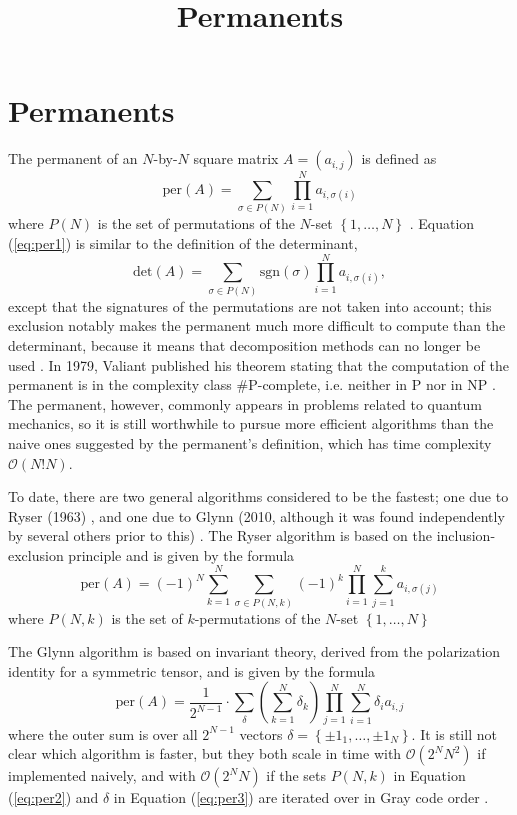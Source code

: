 \documentclass{article}
\title{Permanents}
\begin{document}
\section*{Permanents}

The permanent of an $N$-by-$N$ square matrix $A = \left(a_{i,j}\right)$ is defined as
\begin{equation} \label{eq:per1}
    \text{per}(A) = \sum_{\sigma \in P(N)}{\prod_{i=1}^N{a_{i,{\sigma(i)}}}}
\end{equation}
where $P(N)$ is the set of permutations of the $N$-set $\left\{1,\dots,N\right\}$
\cite{wiki:permanent}. Equation (\ref{eq:per1}) is similar to the definition of the determinant,
\begin{equation} \label{eq:det1}
    \text{det}(A) = \sum_{\sigma \in P(N)}{\text{sgn}(\sigma) \prod_{i=1}^N{a_{i,{\sigma(i)}}}},
\end{equation}
except that the signatures of the permutations are not taken into account; this exclusion notably
makes the permanent much more difficult to compute than the determinant, because it means that
decomposition methods can no longer be used \cite{wiki:computing}. In 1979, Valiant published his
theorem stating that the computation of the permanent is in the complexity class \#P-complete, i.e.
neither in P nor in NP \cite{valiant1979}. The permanent, however, commonly appears in problems
related to quantum mechanics, so it is still worthwhile to pursue more efficient algorithms than the
naive ones suggested by the permanent's definition, which has time complexity $\mathcal{O}(N!N)$.

To date, there are two general algorithms considered to be the fastest; one due to Ryser (1963)
\cite{ryser1963}, and one due to Glynn (2010, although it was found independently by several others
prior to this) \cite{wiki:computing,glynn2010}. The Ryser algorithm is based on the
inclusion-exclusion principle and is given by the formula
\begin{equation} \label{eq:per2}
    \text{per}(A) = \left(-1\right)^N \sum_{k=1}^N{
        \sum_{\sigma \in P(N,k)}{
            {\left(-1\right)}^{k}
            \prod_{i=1}^N{
                \sum_{j=1}^{k}{a_{i,{\sigma(j)}}}
            }
        }
    }
\end{equation}
where $P(N,k)$ is the set of $k$-permutations of the $N$-set $\left\{1,\dots,N\right\}$

The Glynn algorithm is based on invariant theory, derived from the polarization identity for
a symmetric tensor, and is given by the formula
\begin{equation} \label{eq:per3}
    \text{per}(A) = \frac{1}{2^{N-1}} \cdot \sum_{\delta}{
        \left(\sum_{k=1}^N{\delta_k}\right)
        \prod_{j=1}^N{\sum_{i=1}^N{\delta_i a_{i,j}}}
    }
\end{equation}
where the outer sum is over all $2^{N-1}$ vectors $\delta = \left\{\pm 1_1,\dots,\pm 1_N\right\}$.
It is still not clear which algorithm is faster, but they both scale in time with $\mathcal{O}(2^N
N^2)$ if implemented naively, and with $\mathcal{O}(2^N N)$ if the sets $P(N,k)$ in Equation
(\ref{eq:per2}) and $\delta$ in Equation (\ref{eq:per3}) are iterated over in Gray code order
\cite{wiki:computing,knuth2005}.
\end{document}
